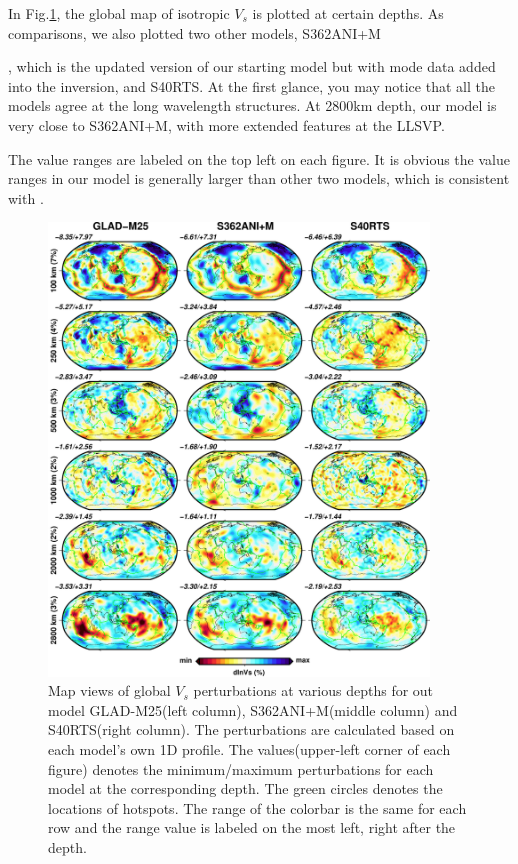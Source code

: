 \documentclass[extra,mreferee]{gji}
\begin{document}
In Fig.\ref{fig:global-vs}, the global map of isotropic $V_s$ is plotted at certain depths.
As comparisons, we also plotted two other models, S362ANI+M{\citep{moulik2014anisotropic},
which is the updated version of our starting model but with mode data added
into the inversion, and S40RTS\citep{ritsema2011s40rts}. At the first glance,
you may notice that all the models agree at the long wavelength structures.
At 2800km depth, our model is very close to S362ANI+M, with more extended
features at the LLSVP.

The value ranges are labeled on the top left on each figure. It is obvious the
value ranges in our model is generally larger than other two models, which is
consistent with \cite{french2014whole}.

\begin{figure}
  \centering
  \includegraphics[width=0.9\textwidth]{figures/depth_slice/globe_vs.pdf}
  \caption{Map views of global $V_s$ perturbations at various depths for out model
  GLAD-M25(left column), S362ANI+M(middle column)\citep{moulik2014anisotropic}
  and S40RTS(right column)\citep{ritsema2011s40rts}. The perturbations are
  calculated based on each model's own 1D profile. The values(upper-left corner
  of each figure) denotes the minimum/maximum perturbations for each model at
  the corresponding depth. The green circles denotes the locations of
  hotspots\citep{montelli2006catalogue}. The range of the colorbar is the same
  for each row and the range value is labeled on the most left, right after
  the depth.}
  \label{fig:global-vs}
\end{figure}

}
\end{document}
